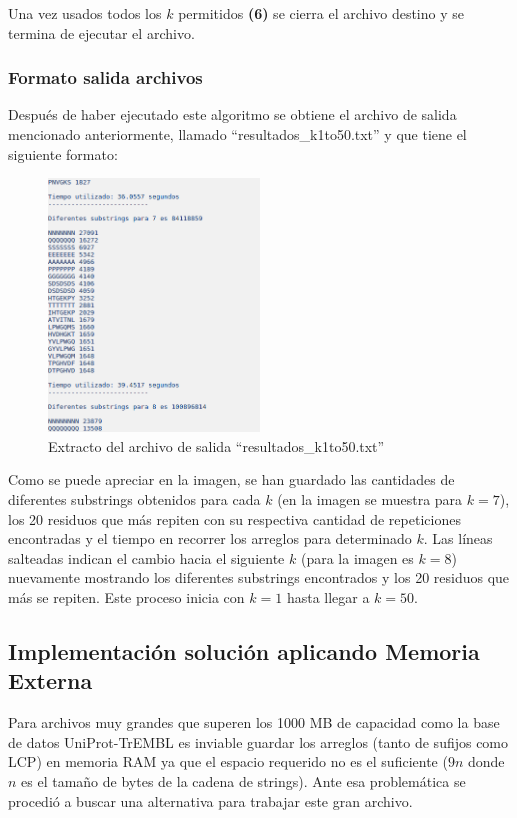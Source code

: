 Una vez usados todos los $k$ permitidos \textbf{(6)} se cierra el archivo destino y se termina de ejecutar el archivo.

\subsubsection{Formato salida archivos}

Después de haber ejecutado este algoritmo se obtiene el archivo de salida mencionado anteriormente, llamado ``resultados\_k1to50.txt'' y que tiene el siguiente formato:

\begin{figure}[h]
    \centering
    \includegraphics[width=0.5\textwidth]{./images/formatosalidaswissprot.png}
    \caption{Extracto del archivo de salida ``resultados\_k1to50.txt''}
\end{figure}

Como se puede apreciar en la imagen, se han guardado las cantidades de diferentes substrings obtenidos para cada $k$ (en la imagen se muestra para $k = 7$), los 20 residuos que más repiten con su respectiva cantidad de repeticiones encontradas y el tiempo en recorrer los arreglos para determinado $k$. Las líneas salteadas indican el cambio hacia el siguiente $k$ (para la imagen es $k=8$) nuevamente mostrando los diferentes substrings encontrados y los 20 residuos que más se repiten. Este proceso inicia con $k=1$ hasta llegar a $k=50$.

\subsection{Implementación solución aplicando Memoria Externa}

Para archivos muy grandes que superen los 1000 MB de capacidad como la base de datos UniProt-TrEMBL es inviable guardar los arreglos (tanto de sufijos como LCP) en memoria RAM ya que el espacio requerido no es el suficiente ($9n$ donde $n$ es el tamaño de bytes de la cadena de strings). Ante esa problemática se procedió a buscar una alternativa para trabajar este gran archivo.

